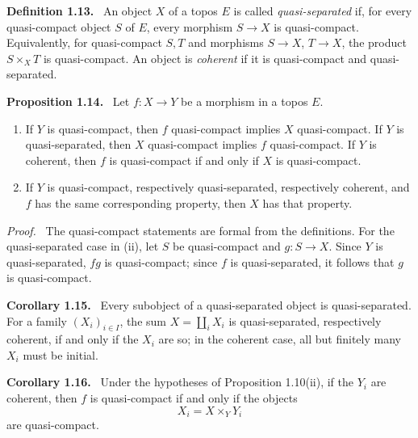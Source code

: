 \documentclass[11pt]{article}
\newcommand{\fprod}[3]{{#1}\times_{#3}{#2}}
\newenvironment{statement}[1]{\par\medskip\noindent\textbf{#1.}\ }{\par\medskip}
\newenvironment{prooftext}{\par\noindent\emph{Proof.}\ }{\par\medskip}
\begin{document}
\begin{statement}{Definition 1.13}
An object \(X\) of a topos \(E\) is called \emph{quasi-separated} if, for every quasi-compact object \(S\) of \(E\), every morphism \(S\to X\) is quasi-compact. Equivalently, for quasi-compact \(S,T\) and morphisms \(S\to X\), \(T\to X\), the product \(S\times_XT\) is quasi-compact. An object is \emph{coherent} if it is quasi-compact and quasi-separated.
\end{statement}

\begin{statement}{Proposition 1.14}
Let \(f:X\to Y\) be a morphism in a topos \(E\).
\begin{enumerate}[label=(\roman*)]
\item If \(Y\) is quasi-compact, then \(f\) quasi-compact implies \(X\) quasi-compact. If \(Y\) is quasi-separated, then \(X\) quasi-compact implies \(f\) quasi-compact. If \(Y\) is coherent, then \(f\) is quasi-compact if and only if \(X\) is quasi-compact.
\item If \(Y\) is quasi-compact, respectively quasi-separated, respectively coherent, and \(f\) has the same corresponding property, then \(X\) has that property.
\end{enumerate}
\end{statement}

\begin{prooftext}
The quasi-compact statements are formal from the definitions. For the quasi-separated case in (ii), let \(S\) be quasi-compact and \(g:S\to X\). Since \(Y\) is quasi-separated, \(fg\) is quasi-compact; since \(f\) is quasi-separated, it follows that \(g\) is quasi-compact.
\end{prooftext}

\begin{statement}{Corollary 1.15}
Every subobject of a quasi-separated object is quasi-separated. For a family \((X_i)_{i\in I}\), the sum \(X=\coprod_iX_i\) is quasi-separated, respectively coherent, if and only if the \(X_i\) are so; in the coherent case, all but finitely many \(X_i\) must be initial.
\end{statement}

\begin{statement}{Corollary 1.16}
Under the hypotheses of Proposition 1.10(ii), if the \(Y_i\) are coherent, then \(f\) is quasi-compact if and only if the objects
\[
X_i=\fprod{X}{Y_i}{Y}
\]
are quasi-compact.
\end{statement}
\end{document}
